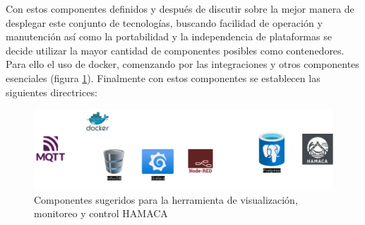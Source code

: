 Con estos componentes definidos y después de discutir sobre la mejor manera de desplegar este conjunto de tecnologías, buscando facilidad de operación y manutención así como la portabilidad y la independencia de plataformas se decide utilizar la mayor cantidad de componentes posibles como contenedores. Para ello el uso de docker\cite{docker}, comenzando por las integraciones y otros componentes esenciales (figura \ref{fig:componentes_hamaca}). Finalmente con estos componentes se establecen las siguientes directrices:

\begin{figure}[!htb]
\centering
\includegraphics[scale=0.35]{./Figuras/componentes_hamaca.png}
\caption{Componentes sugeridos para la herramienta de visualización, monitoreo y control HAMACA}
\label{fig:componentes_hamaca}
\vspace*{-10pt}
\end{figure}


